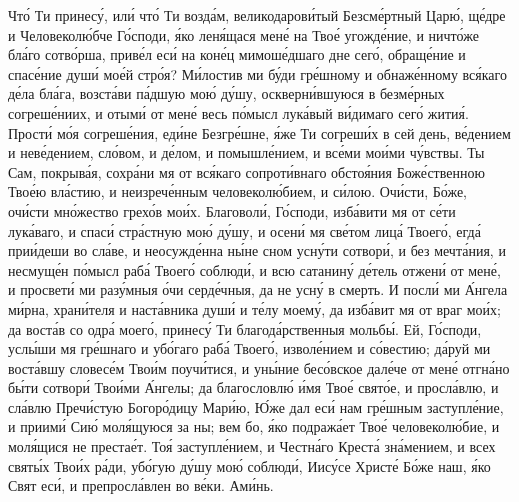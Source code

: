\begin{mymulticols}
Чт\'{о} Ти принес\'{у}, ил\'{и} чт\'{о} Ти возд\'{а}м, великодаров\'{и}тый Безсм\'{е}ртный Цар\'{ю}, щ\'{е}дре и Человекол\'{ю}бче Г\'{о}споди, \'{я}ко лен\'{я}щася мен\'{е} на Тво\'{е} угожд\'{е}ние, и ничт\'{о}же бл\'{а}го сотв\'{о}рша, прив\'{е}л ес\'{и} на кон\'{е}ц мимош\'{е}дшаго дне сег\'{о}, обращ\'{е}ние и спас\'{е}ние душ\'{и} мо\'{е}й стр\'{о}я? М\'{и}лостив ми б\'{у}ди гр\'{е}шному и обнаж\'{е}нному вс\'{я}каго д\'{е}ла бл\'{а}га, возст\'{а}ви п\'{а}дшую мо\'{ю} д\'{у}шу, оскверн\'{и}вшуюся в безм\'{е}рных согреш\'{е}ниих, и отым\'{и} от мен\'{е} весь п\'{о}мысл лук\'{а}вый в\'{и}димаго сег\'{о} жити\'{я}. Прост\'{и} м\'{о}я согреш\'{е}ния, ед\'{и}не Безгр\'{е}шне, \'{я}же Ти согреш\'{и}х в сей день, в\'{е}дением и нев\'{е}дением, сл\'{о}вом, и д\'{е}лом, и помышл\'{е}нием, и вс\'{е}ми мо\'{и}ми ч\'{у}вствы. Ты Сам, покрыв\'{а}я, сохр\'{а}ни мя от вс\'{я}каго сопрот\'{и}внаго обсто\'{я}ния Бож\'{е}ственною Тво\'{е}ю вл\'{а}стию, и неизреч\'{е}нным человекол\'{ю}бием, и с\'{и}лою. Оч\'{и}сти, Б\'{о}же, оч\'{и}сти мн\'{о}жество грех\'{о}в мо\'{и}х. Благовол\'{и}, Г\'{о}споди, изб\'{а}вити мя от с\'{е}ти лук\'{а}ваго, и спас\'{и} стр\'{а}стную мо\'{ю} д\'{у}шу, и осен\'{и} мя св\'{е}том лиц\'{а} Твоег\'{о}, егд\'{а} при\'{и}деши во сл\'{а}ве, и неосужд\'{е}нна н\'{ы}не сном усн\'{у}ти сотвор\'{и}, и без мечт\'{а}ния, и несмущ\'{е}н п\'{о}мысл раб\'{а} Твоег\'{о} соблюд\'{и}, и всю сатанин\'{у} д\'{е}тель отжен\'{и} от мен\'{е}, и просвет\'{и} ми раз\'{у}мныя \'{о}чи серд\'{е}чныя, да не усн\'{у} в смерть. И посл\'{и} ми \'{А}нгела м\'{и}рна, хран\'{и}теля и наст\'{а}вника душ\'{и} и т\'{е}лу моем\'{у}, да изб\'{а}вит мя от враг мо\'{и}х; да вост\'{а}в со одр\'{а} моег\'{о}, принес\'{у} Ти благод\'{а}рственныя мольб\'{ы}. Ей, Г\'{о}споди, усл\'{ы}ши мя гр\'{е}шнаго и уб\'{о}гаго раб\'{а} Твоег\'{о}, извол\'{е}нием и с\'{о}вестию; д\'{а}руй ми вост\'{а}вшу словес\'{е}м Тво\'{и}м поуч\'{и}тися, и ун\'{ы}ние бес\'{о}вское дал\'{е}че от мен\'{е} отгн\'{а}но б\'{ы}ти сотвор\'{и} Тво\'{и}ми \'{А}нгелы; да благословл\'{ю} \'{и}мя Тво\'{е} свят\'{о}е, и просл\'{а}влю, и сл\'{а}влю Преч\'{и}стую Богор\'{о}дицу Мар\'{и}ю, \'{Ю}же дал ес\'{и} нам гр\'{е}шным заступл\'{е}ние, и приим\'{и} Си\'{ю} мол\'{я}щуюся за ны; вем бо, \'{я}ко подраж\'{а}ет Тво\'{е} человекол\'{ю}бие, и мол\'{я}щися не преста\'{е}т. То\'{я} заступл\'{е}нием, и Честн\'{а}го Крест\'{а} зн\'{а}мением, и всех свят\'{ы}х Тво\'{и}х р\'{а}ди, уб\'{о}гую д\'{у}шу мо\'{ю} соблюд\'{и}, Иис\'{у}се Христ\'{е} Б\'{о}же наш, \'{я}ко Свят ес\'{и}, и препросл\'{а}влен во в\'{е}ки. Ам\'{и}нь.


\end{mymulticols}
